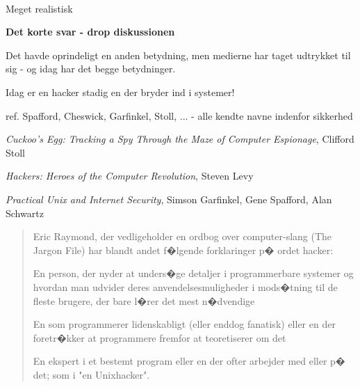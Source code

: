 \documentclass[20pt,landscape,a4paper,footrule]{foils}
\begin{document}

\vskip 2cm




\\
Meget realistisk 



{\bfseries Det korte svar - drop diskussionen}

Det havde oprindeligt en anden betydning, men medierne har taget
udtrykket til sig - og idag har det begge betydninger.

{\color{red}\hlkbig Idag er en hacker stadig en der bryder ind i systemer!}

ref. Spafford, Cheswick, Garfinkel, Stoll, ...
- alle kendte navne indenfor sikkerhed


\begin{list2}
\item \emph{Cuckoo's Egg: Tracking a Spy Through the Maze of Computer
 Espionage},  Clifford Stoll
\item \emph{Hackers: Heroes of the Computer Revolution},
Steven Levy
\item \emph{Practical Unix and Internet Security},
Simson Garfinkel, Gene Spafford, Alan Schwartz
\end{list2}


\begin{quote}
Eric Raymond, der vedligeholder en ordbog over computer-slang (The Jargon File) har blandt andet f�lgende forklaringer p� ordet hacker:
\begin{list2}
\item En person, der nyder at unders�ge detaljer i programmerbare systemer og hvordan man udvider deres anvendelsesmuligheder i mods�tning til de fleste brugere, der bare l�rer det mest n�dvendige
\item En som programmerer lidenskabligt (eller enddog fanatisk) eller en der foretr�kker at programmere fremfor at teoretiserer om det
\item En ekspert i et bestemt program eller en der ofter arbejder med eller p� det; som i "en Unixhacker".
\end{list2}
\end{quote}
\end{document}
